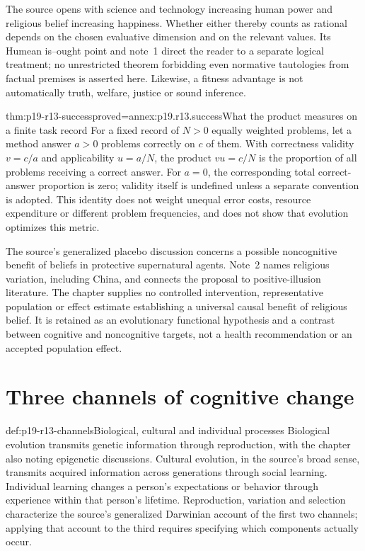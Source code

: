 The source opens with science and technology increasing human power and
religious belief increasing happiness. Whether either thereby counts as
rational depends on the chosen evaluative dimension and on the relevant
values. Its Humean is--ought point and note~1 direct the reader to a separate
logical treatment; no unrestricted theorem forbidding even normative
tautologies from factual premises is asserted here. Likewise, a fitness
advantage is not automatically truth, welfare, justice or sound inference.

\begin{hblemma}{thm:p19-r13-success}{proved=annex:p19.r13.success}{What the product measures on a finite task record}
For a fixed record of \(N>0\) equally weighted problems, let a method answer
\(a>0\) problems correctly on \(c\) of them. With correctness validity
\(v=c/a\) and applicability \(u=a/N\), the product \(vu=c/N\)
is the proportion of all problems receiving a correct answer. For \(a=0\),
the corresponding total correct-answer proportion is zero; validity itself
is undefined unless a separate convention is adopted. This identity does
not weight unequal error costs, resource expenditure or different problem
frequencies, and does not show that evolution optimizes this metric.
\end{hblemma}

The source's generalized placebo discussion concerns a possible noncognitive
benefit of beliefs in protective supernatural agents. Note~2 names religious
variation, including China, and connects the proposal to positive-illusion
literature. The chapter supplies no controlled intervention, representative
population or effect estimate establishing a universal causal benefit of
religious belief. It is retained as an evolutionary functional hypothesis
and a contrast between cognitive and noncognitive targets, not a health
recommendation or an accepted population effect.

\section{Three channels of cognitive change}
\label{sec:p19-r13-channels}

\begin{hbdefinition}{def:p19-r13-channels}{Biological, cultural and individual processes}
Biological evolution transmits genetic information through reproduction,
with the chapter also noting epigenetic discussions. Cultural evolution,
in the source's broad sense, transmits acquired information across
generations through social learning. Individual learning changes a person's
expectations or behavior through experience within that person's lifetime.
Reproduction, variation and selection characterize the source's generalized
Darwinian account of the first two channels; applying that account to the
third requires specifying which components actually occur.
\end{hbdefinition}

